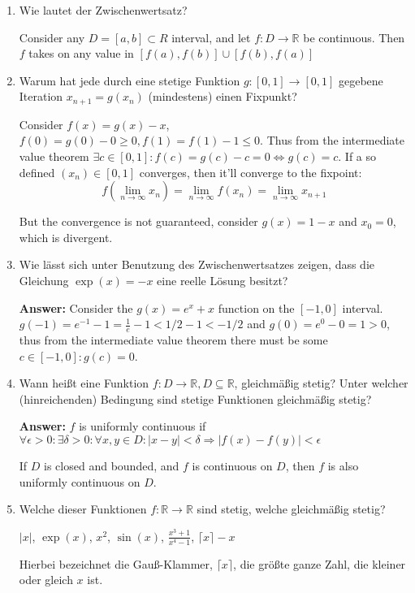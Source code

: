 \documentclass[11pt]{article}
\begin{document}
\begin{enumerate}
\item Wie lautet der Zwischenwertsatz?

Consider any $D = [a, b] \subset R$ interval, and let $f\colon D \to \mathbb{R}$ be continuous. Then $f$ takes on any value in $[f(a), f(b)] \cup [f(b), f(a)]$

\item Warum hat jede durch eine stetige Funktion $g\colon [0,1] \to [0,1]$ gegebene Iteration $x_{n+1} = g(x_n)$ (mindestens) einen Fixpunkt?

Consider $f(x) = g(x) - x$, $f(0) = g(0) - 0 \ge 0, f(1) = f(1) - 1 \le 0$. Thus from the intermediate value theorem $\exists c\in[0, 1]\colon f(c) = g(c) - c = 0 \Leftrightarrow g(c) = c$. If a so defined $(x_n) \in [0,1]$ converges, then it'll converge to the fixpoint:
$$f(\lim_{n\to\infty} x_n) = \lim_{n\to\infty} f(x_n) = \lim_{n\to\infty} x_{n+1}$$

But the convergence is not guaranteed, consider $g(x) = 1-x$ and $x_0 = 0$, which is divergent.


\item Wie lässt sich unter Benutzung des Zwischenwertsatzes zeigen, dass die Gleichung $\exp(x) = -x$ eine reelle Lösung besitzt?

\textbf{Answer:} Consider the $g(x) = e^x + x$ function on the $[-1, 0]$ interval. $g(-1) = e^{-1} - 1 = \frac{1}{e} - 1 < 1/2 - 1 < -1/2$ and $g(0) = e^{0} - 0 = 1 > 0$, thus from the intermediate value theorem there must be some $c \in [-1, 0]\colon g(c) = 0$.

\item Wann heißt eine Funktion $f\colon D \to \mathbb{R}, D \subseteq \mathbb{R}$, gleichmäßig stetig? Unter welcher (hinreichenden) Bedingung sind stetige Funktionen gleichmäßig stetig?

\textbf{Answer:} $f$ is uniformly continuous if $\forall \epsilon > 0\colon \exists \delta > 0\colon \forall x, y \in D\colon | x - y| < \delta \Rightarrow |f(x) - f(y) | < \epsilon$

If $D$ is closed and bounded, and $f$ is continuous on $D$, then $f$ is also uniformly continuous on $D$.

\item  Welche dieser Funktionen $f\colon \mathbb{R} \to \mathbb{R}$ sind stetig, welche gleichmäßig stetig?
 \begin{center}
    $|x|$,   $\operatorname{exp}(x)$, $x^2$, $\sin(x)$, $\frac{x^3+1}{x^4-1}$, $\lceil x \rceil - x$
\end{center}
Hierbei bezeichnet die Gauß-Klammer, $\lceil x \rceil$, die größte ganze Zahl, die kleiner oder gleich $x$ ist.


\end{enumerate}
\end{document}
